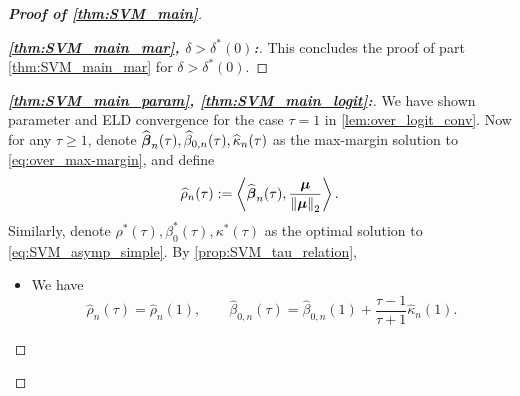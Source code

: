 \begin{proof}[\textbf{Proof of \cref{thm:SVM_main}}]
\begin{proof}[\textbf{\emph{\ref{thm:SVM_main_mar}, $\delta > \delta^*(0)$:}}]
This concludes the proof of part \ref{thm:SVM_main_mar} for $\delta > \delta^*(0)$.
\end{proof}








\begin{proof}[\textbf{\emph{\ref{thm:SVM_main_param}, \ref{thm:SVM_main_logit}:}}]
We have shown parameter and ELD convergence for the case $\tau = 1$ in \cref{lem:over_logit_conv}. Now for any $\tau \ge 1$, denote $\widehat{{\boldsymbol{\beta}}}_n(\tau), \widehat\beta_{0, n}(\tau), \widehat\kappa_n(\tau)$ as the max-margin solution to \cref{eq:over_max-margin}, and define
\begin{equation*}
     \widehat\rho_n(\tau) :=  \left\langle \widehat{{\boldsymbol{\beta}}}_n(\tau), \frac{{\boldsymbol{\mu}}}{\left\|{{\boldsymbol{\mu}}}\right\|_2 } \right\rangle.
\end{equation*}
Similarly, denote $\rho^*(\tau), \beta_0^*(\tau), \kappa^*(\tau)$ as the optimal solution to \cref{eq:SVM_asymp_simple}. By \cref{prop:SVM_tau_relation},
\begin{itemize}
    \item We have
    \begin{equation}\label{eq:param_hat_tau}
        \hat\rho_n(\tau) = \hat\rho_n(1),
        \qquad
        \hat\beta_{0, n}(\tau) = \hat\beta_{0, n}(1) + \frac{\tau - 1}{\tau + 1} \hat\kappa_n(1). 
    \end{equation}


\end{itemize}
\end{proof}
\end{proof}
